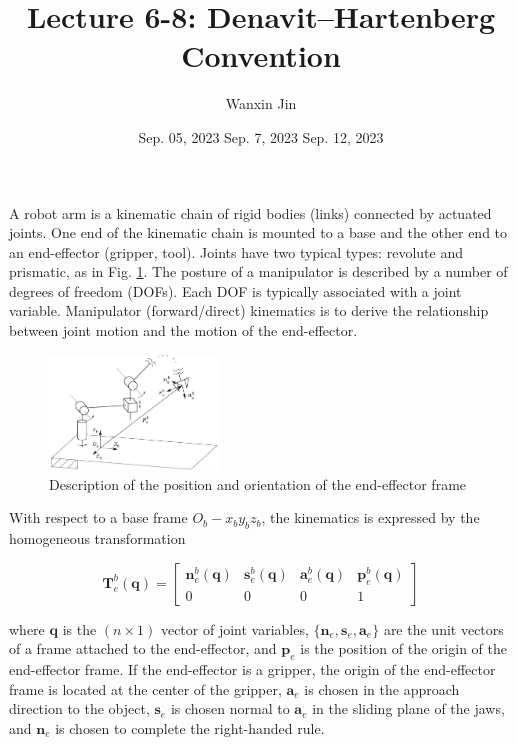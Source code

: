 \documentclass[10pt]{article}
\begin{document}
\title{Lecture 6-8:  Denavit–Hartenberg Convention}
\date{Sep. 05, 2023 \quad Sep. 7, 2023 \quad Sep. 12, 2023 }
\author{Wanxin Jin}
\maketitle



A robot arm is a kinematic chain of rigid bodies (links) connected by actuated joints. One end of the kinematic chain is mounted to a base and the other end to an end-effector (gripper, tool). Joints have two typical types: revolute and prismatic, as  in Fig. \ref{c1.fig.joints-types}.  
The posture of a manipulator is described by a number of degrees of freedom (DOFs). Each DOF is typically associated with a joint variable. Manipulator (forward/direct) kinematics is to derive the relationship between joint motion and the motion of the end-effector.













\begin{figure}[h]
    \centering
   \includegraphics[max width=0.4\textwidth]{./kinematics/end-effector_frame}
    \caption{Description of the position and orientation of the end-effector frame}
    \label{c1.fig.joints-types}
\end{figure}

With respect to a base frame $O_{b}-x_{b} y_{b} z_{b}$, the  kinematics  is expressed by the homogeneous transformation 

$$
\boldsymbol{T}_{e}^{b}(\boldsymbol{q})=\left[\begin{array}{cccc}
\boldsymbol{n}_{e}^{b}(\boldsymbol{q}) & \boldsymbol{s}_{e}^{b}(\boldsymbol{q}) & \boldsymbol{a}_{e}^{b}(\boldsymbol{q}) & \boldsymbol{p}_{e}^{b}(\boldsymbol{q}) \\
0 & 0 & 0 & 1
\end{array}\right]
$$

where $\boldsymbol{q}$ is the $(n \times 1)$ vector of joint variables, $\{\boldsymbol{n}_{e}, \boldsymbol{s}_{e}, \boldsymbol{a}_{e}\}$ are the unit vectors of a frame attached to the end-effector, and $\boldsymbol{p}_{e}$ is the position  of the origin of the end-effector frame.  If the end-effector is a gripper, the origin of the end-effector frame is located at the center of the gripper,  $\boldsymbol{a}_{e}$ is chosen in the approach direction to the object, $\boldsymbol{s}_{e}$ is chosen normal to $\boldsymbol{a}_{e}$ in the sliding plane of the jaws, and  $\boldsymbol{n}_{e}$ is chosen to complete the right-handed rule.
\end{document}
